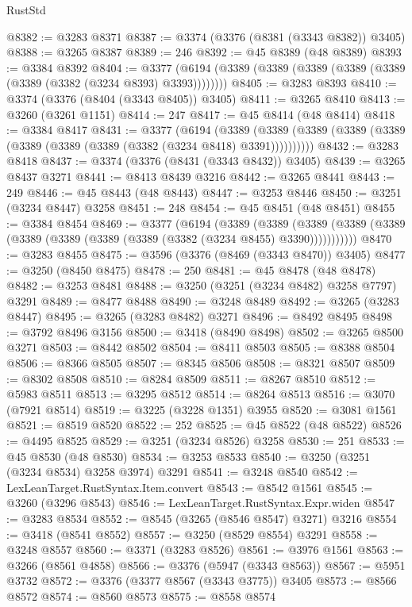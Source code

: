 \begin{lexlean}{RustStd}
\begin{coremodule}
@8382 := @3283 @8371
@8387 := @3374 (@3376 (@8381 (@3343 @8382)) @3405)
@8388 := @3265 @8387
@8389 := 246
@8392 := @45 @8389 (@48 @8389)
@8393 := @3384 @8392
@8404 := @3377 (@6194 (@3389 (@3389 (@3389 (@3389 (@3389 (@3389 (@3382 (@3234 @8393) @3393))))))))
@8405 := @3283 @8393
@8410 := @3374 (@3376 (@8404 (@3343 @8405)) @3405)
@8411 := @3265 @8410
@8413 := @3260 (@3261 @1151)
@8414 := 247
@8417 := @45 @8414 (@48 @8414)
@8418 := @3384 @8417
@8431 := @3377
    (@6194
      (@3389 (@3389 (@3389 (@3389 (@3389 (@3389 (@3389 (@3389 (@3382 (@3234 @8418) @3391))))))))))
@8432 := @3283 @8418
@8437 := @3374 (@3376 (@8431 (@3343 @8432)) @3405)
@8439 := @3265 @8437 @3271
@8441 := @8413 @8439 @3216
@8442 := @3265 @8441
@8443 := 249
@8446 := @45 @8443 (@48 @8443)
@8447 := @3253 @8446
@8450 := @3251 (@3234 @8447) @3258
@8451 := 248
@8454 := @45 @8451 (@48 @8451)
@8455 := @3384 @8454
@8469 := @3377
    (@6194
      (@3389
        (@3389
          (@3389 (@3389 (@3389 (@3389 (@3389 (@3389 (@3389 (@3382 (@3234 @8455) @3390)))))))))))
@8470 := @3283 @8455
@8475 := @3596 (@3376 (@8469 (@3343 @8470)) @3405)
@8477 := @3250 (@8450 @8475)
@8478 := 250
@8481 := @45 @8478 (@48 @8478)
@8482 := @3253 @8481
@8488 := @3250 (@3251 (@3234 @8482) @3258 @7797) @3291
@8489 := @8477 @8488
@8490 := @3248 @8489
@8492 := @3265 (@3283 @8447)
@8495 := @3265 (@3283 @8482) @3271
@8496 := @8492 @8495
@8498 := @3792 @8496 @3156
@8500 := @3418 (@8490 @8498)
@8502 := @3265 @8500 @3271
@8503 := @8442 @8502
@8504 := @8411 @8503
@8505 := @8388 @8504
@8506 := @8366 @8505
@8507 := @8345 @8506
@8508 := @8321 @8507
@8509 := @8302 @8508
@8510 := @8284 @8509
@8511 := @8267 @8510
@8512 := @5983 @8511
@8513 := @3295 @8512
@8514 := @8264 @8513
@8516 := @3070 (@7921 @8514)
@8519 := @3225 (@3228 @1351) @3955
@8520 := @3081 @1561
@8521 := @8519 @8520
@8522 := 252
@8525 := @45 @8522 (@48 @8522)
@8526 := @4495 @8525
@8529 := @3251 (@3234 @8526) @3258
@8530 := 251
@8533 := @45 @8530 (@48 @8530)
@8534 := @3253 @8533
@8540 := @3250 (@3251 (@3234 @8534) @3258 @3974) @3291
@8541 := @3248 @8540
@8542 := LexLeanTarget.RustSyntax.Item.convert
@8543 := @8542 @1561
@8545 := @3260 (@3296 @8543)
@8546 := LexLeanTarget.RustSyntax.Expr.widen
@8547 := @3283 @8534
@8552 := @8545 (@3265 (@8546 @8547) @3271) @3216
@8554 := @3418 (@8541 @8552)
@8557 := @3250 (@8529 @8554) @3291
@8558 := @3248 @8557
@8560 := @3371 (@3283 @8526)
@8561 := @3976 @1561
@8563 := @3266 (@8561 @4858)
@8566 := @3376 (@5947 (@3343 @8563))
@8567 := @5951 @3732
@8572 := @3376 (@3377 @8567 (@3343 @3775)) @3405
@8573 := @8566 @8572
@8574 := @8560 @8573
@8575 := @8558 @8574

\end{coremodule}
\end{lexlean}
